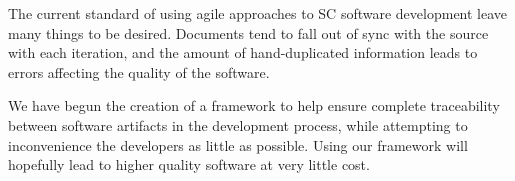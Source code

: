\documentclass{sig-alternate-05-2015}
\begin{document}
The current standard of using agile approaches to SC software development leave
many things to be desired. Documents tend to fall out of sync with the source
with each iteration, and the amount of hand-duplicated information leads to
errors affecting the quality of the software.

We have begun the creation of a framework to help ensure complete traceability
between software artifacts in the development process, while attempting to
inconvenience the developers as little as possible. Using our framework will
hopefully lead to higher quality software at very little cost.


  
\end{document}
